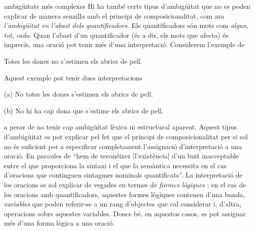 

\begin{persabermes}{ambigüitats més complexes}
  Hi ha també certs tipus d'ambigüitat que no es poden explicar de
  manera senzilla amb el principi de composicionalitat, com ara {\em
    l'ambigüitat en l'abast dels quantificadors}. Els quantificadors
  són mots com \emph{algun}, \emph{tot}, \emph{cada}.  Quan l'abast
  d'un quantificador (és a dir, els mots que afecta) és imprecís, una
  oració pot tenir més d'una interpretació. Considerem l'exemple de \cite{hutchins92b}
\begin{exemple}
Totes les dones no s'estimen els abrics de pell.
\label{eq:abric}
\end{exemple}
Aquest exemple pot tenir dues interpretacions
\begin{exemple}
\item[(a)] No totes les dones s'estimen els abrics de pell.
\item[(b)] No hi ha cap dona que s'estime els abrics de pell.
\end{exemple}
a pesar de no tenir cap ambigüitat lèxica ni estructural aparent.
  Aquest tipus d'ambigüitat es pot
explicar pel fet que el principi de composicionalitat per si sol no és
suficient per a especificar completament l'assignació d'interpretació
a una oració. En paraules de \citet[p.~364]{radford99b} ``hem de
reconéixer [l'existència] d'un buit inacceptable entre el que
proporciona la sintaxi i el que la semàntica necessita en el cas
d'oracions que continguen sintagmes nominals quantificats''. La
interpretació de les oracions se sol explicar de vegades en termes de
{\em formes lògiques} \citep[cap.~23]{radford09b}; en el cas de les
oracions amb quantificadors, aquestes formes lògiques contenen d'una
banda, \emph{variables} que poden referir-se a un rang d'objectes que
cal considerar i, d'altra, operacions sobre aquestes variables.  Doncs
bé, en aquestos casos, es pot assignar més d'una forma lògica a una
oració.

\mbox{}%
\end{persabermes}



